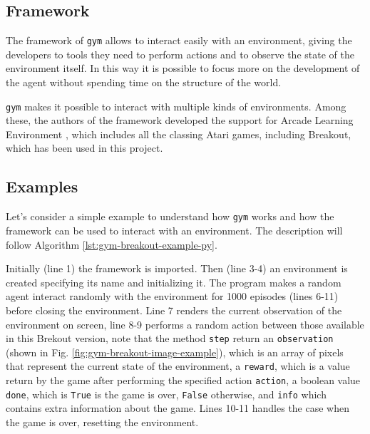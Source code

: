 \documentclass[a4paper]{article}
\begin{document}
\subsection{Framework}
The framework of \texttt{gym} allows to interact easily
with an environment, giving the developers to tools they need to perform
actions and to observe the state of the environment itself. In this way it is
possible to focus more on the development of the agent without spending
time on the structure of the world.

\texttt{gym} makes it possible to interact with multiple kinds of environments.
Among these, the authors of the framework developed the support for
Arcade Learning Environment \cite{bellemare13arcade}, which includes all the
classing Atari games, including Breakout, which has been used in this project.

\subsection{Examples}
Let's consider a simple example to understand how \texttt{gym} works and
how the framework can be used to interact with an environment.
The description will follow Algorithm \ref{lst:gym-breakout-example-py}.



Initially (line 1) the framework is imported. Then (line 3-4) an environment
is created specifying its name and initializing it. The program makes a
random agent interact randomly with the environment for 1000 episodes (lines
6-11) before closing the environment. Line 7 renders the current
observation of the environment on screen, line 8-9 performs a random action
between those available in this Brekout version, note that the method
\texttt{step} return an \texttt{observation} (shown in Fig.
\ref{fig:gym-breakout-image-example}), which is an array of pixels
that represent the current state of the environment, a \texttt{reward},
which is a value return by the game after performing the specified action
\texttt{action}, a boolean value \texttt{done}, which is \texttt{True} is
the game is over, \texttt{False} otherwise, and \texttt{info} which contains
extra information about the game. Lines 10-11 handles the case when the game
is over, resetting the environment.
\end{document}
